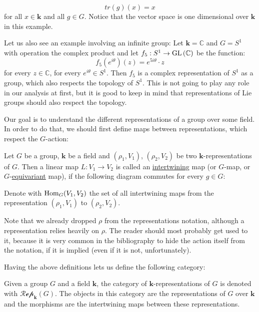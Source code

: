 \begin{examples}
\begin{i_enum}
$$tr(g)(x)=x$$
for all $x\in\mathbf{k}$ and all $g\in G$. Notice that the vector space is one dimensional over $\mathbf{k}$ in this example.
\item Let us also see an example involving an infinite group: Let $\mathbf{k}=\mathbb{C}$ and $G=S^1$ with operation the complex product and let $f_5:S^1\to\GL{\mathbb{C}}$ be the function:
$$f_5(e^{i\theta})(z)=e^{5i\theta}\cdot z$$
for every $z\in\mathbb{C}$, for every $e^{i\theta}\in S^1$. Then $f_5$ is a complex representation of $S^1$ as a group, which also respects the topology of $S^1$. This is not going to play any role in our analysis at first, but it is good to keep in mind that representations of Lie groups should also respect the topology.
\end{i_enum}
\end{examples}

Our goal is to understand the different representations of a group over some field. In order to do that, we should first define maps between representations, which respect the $G$-action:

\begin{definition} Let $G$ be a group, $\mathbf{k}$ be a field and $(\rho_1,V_1)$, $(\rho_2,V_2)$ be two $\mathbf{k}$-representations of $G$. Then a linear map $L:V_1\to V_2$ is called an \ul{intertwining} map (or $G$-map, or $G$-\ul{equivariant} map), if the following diagram commutes for every $g\in G$:
\begin{center}
\end{center}

Denote with $\mathrm{Hom}_G(V_1,V_2)$ the set of all intertwining maps from the representation $(\rho_1,V_1)$ to $(\rho_2,V_2)$.
\end{definition}

Note that we already dropped $\rho$ from the representations notation, although a representation relies heavily on $\rho$. The reader should most probably get used to it, because it is very common in the bibliography to hide the action itself from the notation, if it is implied (even if it is not, unfortunately).

Having the above definitions lets us define the following category:

\begin{definition} Given a group $G$ and a field $\mathbf{k}$, the category of $\mathbf{k}$-representations of $G$ is denoted with $\mathcal{Rep}_{\mathbf{k}}(G)$. The objects in this category are the representations of $G$ over $\mathbf{k}$ and the morphisms are the intertwining maps between these representations.
\end{definition}

